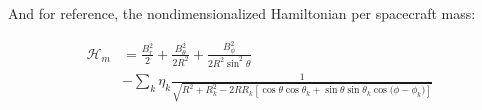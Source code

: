 \vspace{0.2cm}
And for reference, the nondimensionalized Hamiltonian per spacecraft mass:

\begin{equation} \tag{2.105}
    \begin{aligned}
        \mathcal{H}_m &= \frac{B_r^2}{2} + \frac{B_\theta^2}{2 R^2} + \frac{B_\phi^2}{2 R^2 \sin^2{\theta}} \\
        &- \sum\limits_{k} \eta_k \frac{1}{\sqrt{R^2 + R_k^2 - 2 R R_k \left[\cos{\theta}\cos{\theta_k}+\sin{\theta}\sin{\theta_k}\cos{(\phi - \phi_k})\right]}}        
    \end{aligned}
\end{equation}